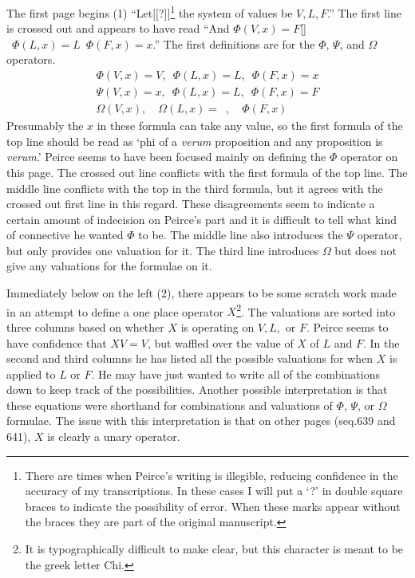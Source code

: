 The first page begins (1) ``Let$[\!\![$?$]\!\!]$\footnote{There are times when Peirce's writing is illegible, reducing confidence in the accuracy of my transcriptions. In these cases I will put a `?' in double square braces to indicate the possibility of error. When these marks appear without the braces they are part of the original manuscript.} the system of values be $V, L, F$.'' The first line is crossed out and appears to have read ``And $ \Phi(V,x)=F$[\!\![$?$]\!\!]$ \enspace \Phi(L,x)=L	\enspace	\Phi(F,x)=x$.'' The first definitions are for the $\Phi$, $\Psi$, and $\Omega$ operators.
\begin{gather*}
\Phi(V, x)= V, \enspace \Phi(L,x)=L, \enspace \Phi(F, x)=x\\
\Psi(V,x)=x, \enspace \Phi(L, x)=L, \enspace \Phi(F,x)=F\\
\Omega(V,x), \quad \Omega(L,x)=\enspace, \quad \Phi(F,x)
\end{gather*}
Presumably the $x$ in these formula can take any value, so the first formula of the top line should be read as `phi of a \textit{verum} proposition and any proposition is \textit{verum}.' Peirce seems to have been focused mainly on defining the $\Phi$ operator on this page. The crossed out line conflicts with the first formula of the top line. The middle line conflicts with the top in the third formula, but it agrees with the crossed out first line in this regard. These disagreements seem to indicate a certain amount of indecision on Peirce's part and it is difficult to tell what kind of connective he wanted $\Phi$ to be. The middle line also introduces the $\Psi$ operator, but only provides one valuation for it. The third line introduces $\Omega$ but does not give any valuations for the formulae on it.

Immediately below on the left (2), there appears to be some scratch work made in an attempt to define a one place operator $X$\footnote{It is typographically difficult to make clear, but this character is meant to be the greek letter Chi.}. The valuations are sorted into three columns based on whether $X$ is operating on $V, L,$ or $F$. Peirce seems to have confidence that $XV=V$, but waffled over the value of $X$ of $L$ and $F$. In the second and third columns he has listed all the possible valuations for when $X$ is applied to $L$ or $F$. He may have just wanted to write all of the combinations down to keep track of the possibilities. Another possible interpretation is that these equations were shorthand for combinations and valuations of $\Phi$, $\Psi$, or $\Omega$ formulae. The issue with this interpretation is that on other pages (seq.639 and 641), $X$ is clearly a unary operator.


